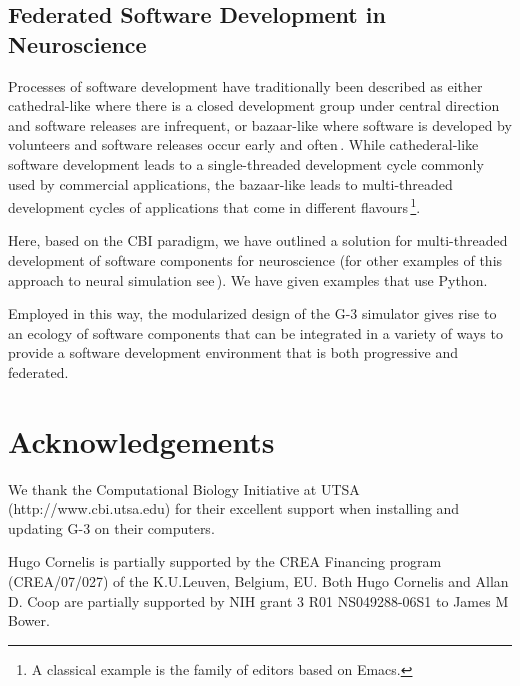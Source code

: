 \documentclass[10pt]{article}
\begin{document}
\subsection*{Federated Software Development in Neuroscience}

Processes of software development have traditionally been described as
either cathedral-like where there is a closed development group under
central direction and software releases are infrequent, or
bazaar-like where software is developed by
volunteers and software releases occur early and
often\,\cite{raymond01:_cathed_bazaar, citeulike:126678}.
While cathederal-like software development leads to a single-threaded
development cycle commonly used by commercial applications, the
bazaar-like leads to multi-threaded development cycles of
applications that come in different flavours\,\footnote{A classical
  example is the family of editors based on Emacs.}.

Here, based on the CBI paradigm, we have outlined a solution for
multi-threaded development of software components for neuroscience
(for other examples of this approach to neural simulation
see\,\cite{schuermann09:_neuron, nordlie09:_visual}).  We have given
examples that use Python.

Employed in this way, the modularized design of the G-3 simulator
gives rise to an ecology of software components that can be integrated
in a variety of ways to provide a software development environment
that is both progressive and federated.

\section*{Acknowledgements}

We thank the Computational Biology Initiative at UTSA (http://www.cbi.utsa.edu) for their excellent support when installing and updating G-3 on their computers.

Hugo Cornelis is partially supported by the CREA Financing program (CREA/07/027) of the K.U.Leuven, Belgium, EU. Both Hugo Cornelis and Allan D. Coop are partially supported by NIH grant 3 R01 NS049288-06S1 to James M Bower.
\end{document}
